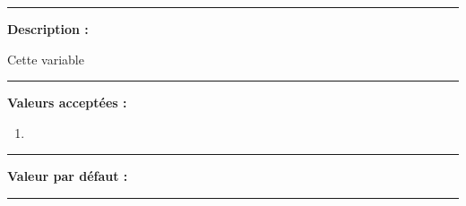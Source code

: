 \documentclass[a4paper,10pt]{article}
\begin{document}
\par\noindent\rule{\textwidth}{0.4pt}

\begin{justify}
    \textbf{Description :}
\end{justify}

\setlength{\parskip}{1em}

\begin{justify}
    Cette variable
\end{justify}

\par\noindent\rule{\textwidth}{0.4pt}

\textbf{Valeurs acceptées :}
\begin{enumerate}
    \item 
\end{enumerate}

\par\noindent\rule{\textwidth}{0.4pt}

\textbf{Valeur par défaut :}



\color{vars}\par\noindent\rule{\textwidth}{0.4pt}\color{text}\\[1\baselineskip]
\end{document}
